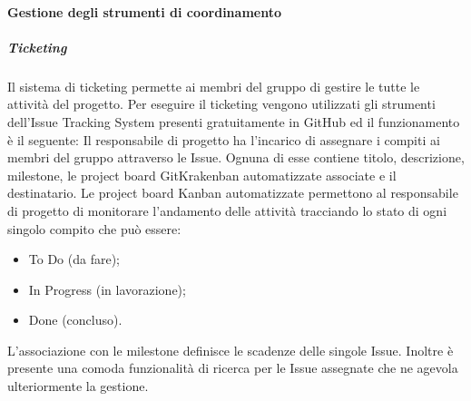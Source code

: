 			\paragraph{Gestione degli strumenti di coordinamento}
				\subparagraph*{Ticketing}
					Il sistema di ticketing permette ai membri del gruppo di gestire le tutte le attività del progetto.
					Per eseguire il ticketing vengono utilizzati gli strumenti dell'Issue Tracking System presenti gratuitamente in GitHub ed il funzionamento è il seguente:
					Il responsabile di progetto ha l'incarico di assegnare i compiti ai membri del gruppo attraverso le Issue. Ognuna di esse contiene titolo, descrizione,  milestone, le project board GitKrakenban automatizzate associate e il destinatario.
					Le project board Kanban automatizzate permettono al responsabile di progetto di monitorare l'andamento delle attività tracciando lo stato di ogni singolo compito che può essere:
					\begin{itemize}
						\item To Do (da fare);
						\item In Progress (in lavorazione);
						\item Done (concluso).
					\end{itemize}
					L'associazione con le milestone definisce le scadenze delle singole Issue.
					Inoltre è presente una comoda funzionalità di ricerca per le Issue assegnate che ne agevola ulteriormente la gestione.
